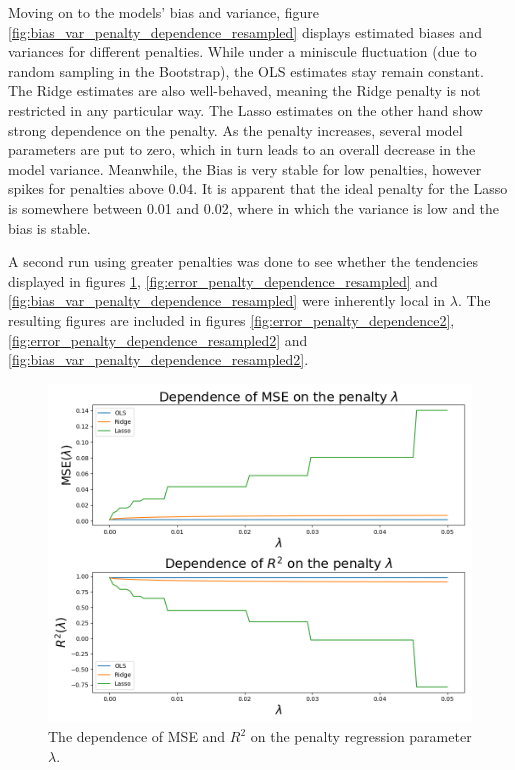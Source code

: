 \documentclass[reprint,english]{revtex4-1}
\begin{document}
Moving on to the models' bias and variance, figure \ref{fig:bias_var_penalty_dependence_resampled} displays estimated biases and variances for different penalties. While under a miniscule fluctuation (due to random sampling in the Bootstrap), the OLS estimates stay remain constant. The Ridge estimates are also well-behaved, meaning the Ridge penalty is not restricted in any particular way. The Lasso estimates on the other hand show strong dependence on the penalty. As the penalty increases, several model parameters are put to zero, which in turn leads to an overall decrease in the model variance. Meanwhile, the Bias is very stable for low penalties, however spikes for penalties above 0.04. It is apparent that the ideal penalty for the Lasso is somewhere between 0.01 and 0.02, where in which the variance is low and the bias is stable.

A second run using greater penalties was done to see whether the tendencies displayed in figures \ref{fig:error_penalty_dependence}, \ref{fig:error_penalty_dependence_resampled} and \ref{fig:bias_var_penalty_dependence_resampled} were inherently local in \(\lambda\). The resulting figures are included in figures \ref{fig:error_penalty_dependence2}, \ref{fig:error_penalty_dependence_resampled2} and \ref{fig:bias_var_penalty_dependence_resampled2}.

\begin{figure}[h]
\centering
\includegraphics[scale=0.3,clip,trim={0cm 0cm 0cm 0cm}]{results/FrankeApprox/error1_deg5.png}
\caption{The dependence of MSE and \(R^2\) on the penalty regression parameter \(\lambda\).}\label{fig:error_penalty_dependence}
\end{figure}
\end{document}
